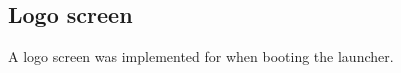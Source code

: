 \subsection{Logo screen}
\label{backlog:logo_screen}

A logo screen was implemented for when booting the launcher.